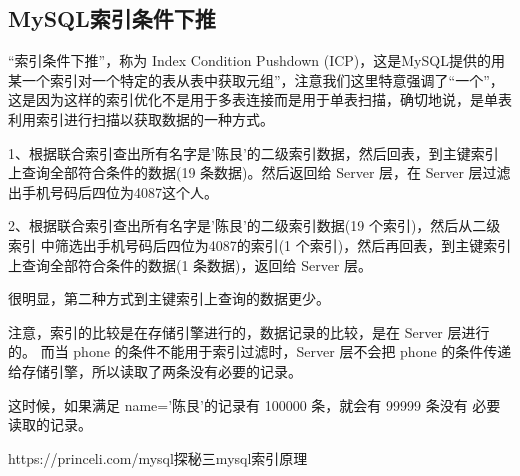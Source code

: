 \documentclass[../../../interview-questions.tex]{subfiles}
\begin{document}
\subsection{MySQL索引条件下推}

“索引条件下推”，称为 Index Condition Pushdown (ICP)，这是MySQL提供的用某一个索引对一个特定的表从表中获取元组”，注意我们这里特意强调了“一个”，这是因为这样的索引优化不是用于多表连接而是用于单表扫描，确切地说，是单表利用索引进行扫描以获取数据的一种方式。


1、根据联合索引查出所有名字是’陈艮’的二级索引数据，然后回表，到主键索引上查询全部符合条件的数据(19 条数据)。然后返回给 Server 层，在 Server 层过滤出手机号码后四位为4087这个人。

2、根据联合索引查出所有名字是’陈艮’的二级索引数据(19 个索引)，然后从二级索引 中筛选出手机号码后四位为4087的索引(1 个索引)，然后再回表，到主键索引上查询全部符合条件的数据(1 条数据)，返回给 Server 层。

很明显，第二种方式到主键索引上查询的数据更少。

注意，索引的比较是在存储引擎进行的，数据记录的比较，是在 Server 层进行的。 而当 phone 的条件不能用于索引过滤时，Server 层不会把 phone 的条件传递 给存储引擎，所以读取了两条没有必要的记录。

这时候，如果满足 name=’陈艮’的记录有 100000 条，就会有 99999 条没有 必要读取的记录。

https://princeli.com/mysql探秘三mysql索引原理
\end{document}
